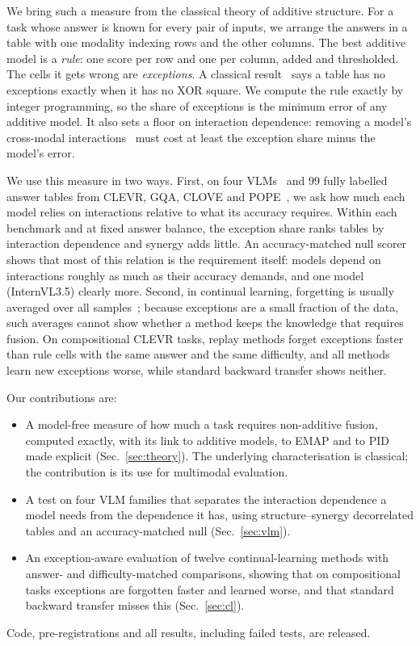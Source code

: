 We bring such a measure from the classical theory of additive structure. For a task whose answer is known for every
pair of inputs, we arrange the answers in a table with one modality indexing rows and the other columns. The best
additive model is a \emph{rule}: one score per row and one per column, added and thresholded. The cells it gets wrong
are \emph{exceptions}. A classical result~\cite{ducamp1969composite,ryser1957combinatorial} says a table has no
exceptions exactly when it has no XOR square. We compute the rule exactly by integer programming, so the share of
exceptions is the minimum error of any additive model. It also sets a floor on interaction dependence: removing a
model's cross-modal interactions~\cite{hessel2020does} must cost at least the exception share minus the model's error.

We use this measure in two ways. First, on four VLMs~\cite{bai2025qwen25vl,wang2025internvl35,an2025llavaov15,laurencon2024building}
and 99 fully labelled answer tables from CLEVR, GQA, CLOVE and POPE~\cite{johnson2017clevr,hudson2019gqa,lei2023symbolic,li2023pope},
we ask how much each model relies on interactions relative to what its accuracy requires. Within each benchmark and at
fixed answer balance, the exception share ranks tables by interaction dependence and synergy adds little. An
accuracy-matched null scorer shows that most of this relation is the requirement itself: models depend on
interactions roughly as much as their accuracy demands, and one model (InternVL3.5) clearly more. Second, in continual
learning, forgetting is usually averaged over all samples~\cite{lopezpaz2017gradient,delange2021continual}; because
exceptions are a small fraction of the data, such averages cannot show whether a method keeps the knowledge that
requires fusion. On compositional CLEVR tasks, replay methods forget exceptions faster than rule cells with the same
answer and the same difficulty, and all methods learn new exceptions worse, while standard backward transfer shows
neither.

Our contributions are:
\begin{itemize}
  \item A model-free measure of how much a task requires non-additive fusion, computed exactly, with its link to
  additive models, to EMAP and to PID made explicit (Sec.~\ref{sec:theory}). The underlying characterisation is
  classical; the contribution is its use for multimodal evaluation.
  \item A test on four VLM families that separates the interaction dependence a model needs from the dependence it has,
  using structure--synergy decorrelated tables and an accuracy-matched null (Sec.~\ref{sec:vlm}).
  \item An exception-aware evaluation of twelve continual-learning methods with answer- and difficulty-matched
  comparisons, showing that on compositional tasks exceptions are forgotten faster and learned worse, and that standard
  backward transfer misses this (Sec.~\ref{sec:cl}).
\end{itemize}
Code, pre-registrations and all results, including failed tests, are released.
